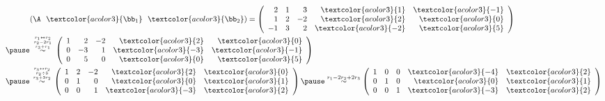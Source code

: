 \begin{frame}\ft{\secname}
\begin{jie}
  $$
  \begin{aligned}
    & (\A~~\textcolor{acolor3}{\bb_1}~~\textcolor{acolor3}{\bb_2})
    = \left(
      \begin{array}{rrrrr}
        2 & 1 & 3 &\textcolor{acolor3}{ 1} & \textcolor{acolor3}{-1}\\
        1 & 2 &-2 &\textcolor{acolor3}{ 2} & \textcolor{acolor3}{ 0}\\
        -1 & 3 & 2 &\textcolor{acolor3}{-2} & \textcolor{acolor3}{ 5}        
      \end{array}\right) \\ \pause
      & \overset{{r_1\leftrightarrow r_2 \atop r_2-2r_1}\atop  r_3+r_1}{\sim}
                               \left(
                               \begin{array}{rrrrr}
                                 1 & 2 &-2 & \textcolor{acolor3}{ 2} & \textcolor{acolor3}{ 0}\\
                                 0 &-3 & 1 & \textcolor{acolor3}{-3} & \textcolor{acolor3}{-1}\\
                                 0 & 5 & 0 & \textcolor{acolor3}{ 0} & \textcolor{acolor3}{ 5}        
                               \end{array}
                                                        \right) \\ \pause
    & \overset{{r_3\leftrightarrow r_2 \atop r_2\div5}\atop  r_3+3r_2}{\sim}
      \left(
      \begin{array}{rrrrr}
        1 & 2 &-2 &\textcolor{acolor3}{ 2} &  \textcolor{acolor3}{0}\\
        0 & 1 & 0 &\textcolor{acolor3}{ 0} &  \textcolor{acolor3}{1}\\
        0 & 0 & 1 &\textcolor{acolor3}{-3} &  \textcolor{acolor3}{2}        
      \end{array}
                              \right)  \pause \overset{r_1-2r_2+2r_3}{\sim}
                              \left(
                              \begin{array}{rrrrr}
                                1 & 0 & 0 & \textcolor{acolor3}{-4} & \textcolor{acolor3}{2}\\
                                0 & 1 & 0 & \textcolor{acolor3}{0} &  \textcolor{acolor3}{1}\\
                                0 & 0 & 1 & \textcolor{acolor3}{-3} &  \textcolor{acolor3}{2}        
                              \end{array}
                                                       \right) 
  \end{aligned}
  $$
\end{jie}

\end{frame}


